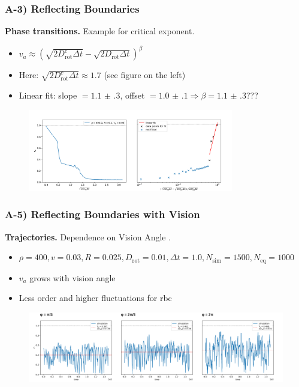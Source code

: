 \documentclass[11pt,t,usepdftitle=false,aspectratio=169]{beamer}
\begin{document}
	\begin{frame}
		\frametitle{A-3) Reflecting Boundaries}
		\textbf{Phase transitions.} Example for critical exponent.
		\begin{itemize}
	    	\item $v_a \approx \left(\sqrt{2D_{\text{rot}}^c\Delta t} - \sqrt{2D_{\text{rot}}\Delta t}\right)^{\beta}$
	    	\item Here: $\sqrt{2D_{\text{rot}}^c\Delta t} \approx 1.7$ (see figure on the left)
	    	\item Linear fit: slope $=\num{1.1(3)}$, offset $=\num{1.0(1)} \Rightarrow \beta = \num{1.1(3)}$???
		\end{itemize}
		\begin{figure}[H]
  			\includegraphics[width=0.8\textwidth]{images/chapter3/rbc_critial_exponent_gone_wrong.png} 
		\end{figure}
\end{frame}
	
	\begin{frame}
		\frametitle{A-5) Reflecting Boundaries with Vision}
		\textbf{Trajectories.} Dependence on Vision Angle .
		\begin{itemize}
	    	\item $\rho = 400, v = 0.03, R = 0.025, D_{\text{rot}} = 0.01, \Delta t = 1.0, N_{\text{sim}} = 1500, N_{\text{eq}} = 1000$
	    	\item $v_a$ grows with vision angle
	    	\item Less order and higher fluctuations for rbc
		\end{itemize}
		\begin{figure}[H]
  			\includegraphics[width=\textwidth]{images/chapter5/trajectory_comp_N_20_L_1.000000_v_0.030000_R_0.030000_D_0.010000.png} 
		\end{figure}
	\end{frame}
\end{document}

